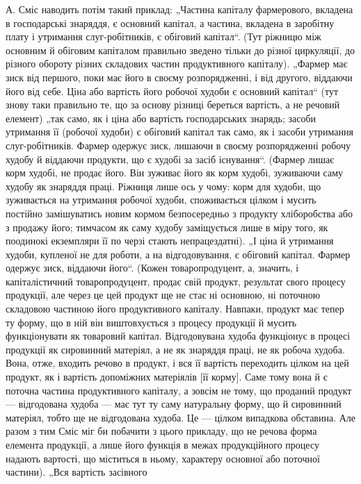 А. Сміс наводить потім такий приклад: „Частина капіталу фармерового,
вкладена в господарські знаряддя, є основний капітал, а частина,
вкладена в заробітну плату і утримання слуг-робітників, є обіговий капітал“.
(Тут ріжницю між основним й обіговим капіталом правильно зведено
тільки до різної циркуляції, до різного обороту різних складових
частин продуктивного капіталу). „Фармер має зиск від першого, поки має
його в своєму розпорядженні, і від другого, віддаючи його від себе.
Ціна або вартість його робочої худоби є основний капітал“ (тут знову таки
правильно те, що за основу різниці береться вартість, а не речовий
елемент) „так само, як і ціна або вартість господарських знарядь; засоби
утримання її (робочої худоби) є обіговий капітал так само, як і засоби
утримання слуг-робітників. Фармер одержує зиск, лишаючи в своєму
розпорядженні робочу худобу й віддаючи продукти, що є худобі за засіб
існування“. (Фармер лишає корм худобі, не продає його. Він зуживає
його як корм худобі, зуживаючи саму худобу як знаряддя праці.
Ріжниця лише ось у чому: корм для худоби, що зуживається на утримання
робочої худоби, споживається цілком і мусить постійно замішуватись
новим кормом безпосередньо з продукту хліборобства або з продажу
його; тимчасом як саму худобу заміщується лише в міру того, як
поодинокі екземпляри її по черзі стають непрацездатні). „І ціна й утримання
худоби, купленої не для роботи, а на відгодовування, є обіговий капітал.
Фармер одержує зиск, віддаючи його“. (Кожен товаропродуцент,
а, значить, і капіталістичний товаропродуцент, продає свій продукт,
результат свого процесу продукції, але через це цей продукт
ще не стає ні основною, ні поточною складовою частиною його
продуктивного капіталу. Навпаки, продукт має тепер ту форму, що
в ній він виштовхується з процесу продукції й мусить функціонувати як товаровий
капітал. Відгодовувана худоба функціонує в процесі продукції як
сировинний матеріял, а не як знаряддя праці, не як робоча худоба. Вона,
отже, входить речово в продукт, і вся її вартість переходить цілком
на цей продукт, як і вартість допоміжних матеріялів [її корму]. Саме тому
вона й є поточна частина продуктивного капіталу, а зовсім не тому,
що проданий продукт — відгодована худоба — має тут ту саму натуральну
форму, що й сировинний матеріял, тобто ще не відгодована худоба. Це —
цілком випадкова обставина. Але разом з тим Сміс міг би побачити з
цього прикладу, що не речова форма елемента продукції, а лише його
функція в межах продукційного процесу надають вартості, що міститься
в ньому, характеру основної або поточної частини). „Вся вартість засівного
